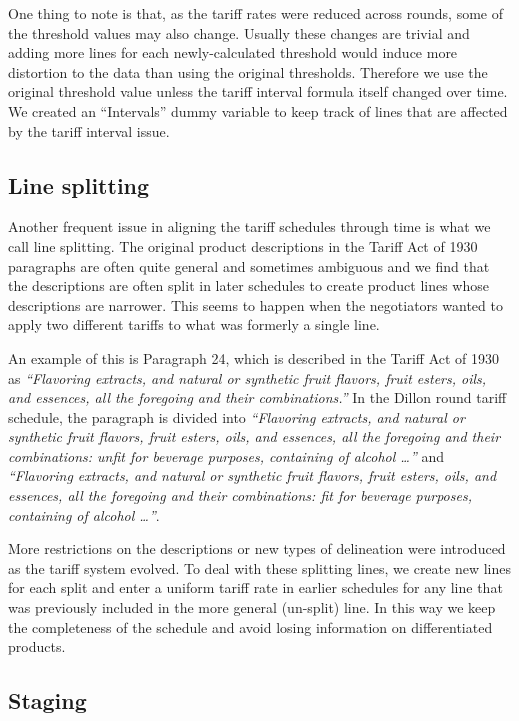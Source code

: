 \documentclass[
  12pt,
]{article}
\begin{document}
One thing to note is that, as the tariff rates were reduced across rounds, some of the threshold values may also change. Usually these changes are trivial and adding more lines for each newly-calculated threshold would induce more distortion to the data than using the original thresholds. Therefore we use the original threshold value unless the tariff interval formula itself changed over time. We created an ``Intervals'' dummy variable to keep track of lines that are affected by the tariff interval issue.

\hypertarget{split}{%
\subsection{Line splitting}\label{split}}

Another frequent issue in aligning the tariff schedules through time is what we call line splitting. The original product descriptions in the Tariff Act of 1930 paragraphs are often quite general and sometimes ambiguous and we find that the descriptions are often split in later schedules to create product lines whose descriptions are narrower. This seems to happen when the negotiators wanted to apply two different tariffs to what was formerly a single line.

An example of this is Paragraph 24, which is described in the Tariff Act of 1930 as \emph{``Flavoring extracts, and natural or synthetic fruit flavors, fruit esters, oils, and essences, all the foregoing and their combinations.''} In the Dillon round tariff schedule, the paragraph is divided into \emph{``Flavoring extracts, and natural or synthetic fruit flavors, fruit esters, oils, and essences, all the foregoing and their combinations: unfit for beverage purposes, containing of alcohol \ldots{}''} and \emph{``Flavoring extracts, and natural or synthetic fruit flavors, fruit esters, oils, and essences, all the foregoing and their combinations: fit for beverage purposes, containing of alcohol \ldots{}''}.

More restrictions on the descriptions or new types of delineation were introduced as the tariff system evolved. To deal with these splitting lines, we create new lines for each split and enter a uniform tariff rate in earlier schedules for any line that was previously included in the more general (un-split) line. In this way we keep the completeness of the schedule and avoid losing information on differentiated products.

\hypertarget{staging}{%
\subsection{Staging}\label{staging}}
\end{document}
